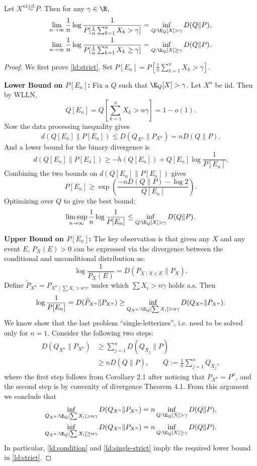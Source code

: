 \begin{theorem}
Let $X^n\stackrel{\mathrm{i.i.d.}}{\sim}P$. Then for any $\gamma\in\R$,
\begin{align}
\lim_{n\to\infty}\frac1n\log\frac1{P[\frac1n\sum_{k=1}^n X_k>\gamma]}
&=\inf_{Q:\E_Q[X]>\gamma}D(Q\|P),\label{ld:strict}\\
\lim_{n\to\infty}\frac1n\log\frac1{P[\frac1n\sum_{k=1}^n X_k\ge\gamma]}
&=\inf_{Q:\E_Q[X]\ge\gamma}D(Q\|P).\label{ld:closed}
\end{align}
\end{theorem}
\begin{proof}
We first prove \eqref{ld:strict}. Set $P[E_n]=P[\frac1n\sum_{k=1}^nX_k>\gamma]$.

\textbf{Lower Bound on $P[E_n]$:} Fix a $Q$ such that $\E_Q[X]>\gamma$. Let $X^n$ be iid. Then by WLLN,
\[
Q[E_n]=Q\left[\sum_{k=1}^nX_k>n\gamma\right]=1-o(1).
\]
Now the data processing inequality gives
\[
d(Q[E_n]\|P[E_n])\le D(Q_{X^n}\|P_{X^n})=nD(Q\|P).
\]
And a lower bound for the binary divergence is
\[
d(Q[E_n]\|P[E_n])\ge-h(Q[E_n])+Q[E_n]\log\frac1{P[E_n]}.
\]
Combining the two bounds on $d(Q[E_n]\|P[E_n])$ gives
\begin{equation}\label{ld:change}
P[E_n]\ge\exp\left(\frac{-nD(Q\|P)-\log2}{Q[E_n]}\right).
\end{equation}
Optimizing over $Q$ to give the best bound:
\[
\limsup_{n\to\infty}\frac1n\log\frac1{P[E_n]}
\le\inf_{Q:\E_Q[X]>\gamma}D(Q\|P).
\]

\textbf{Upper Bound on $P[E_n]$:} The key observation is that given any $X$ and any event $E$, $P_X(E)>0$ can be expressed via the divergence between the conditional and unconditional distribution as:
\[
\log\frac1{P_X(E)}=D(P_{X\mid X\in E}\|P_X).
\]
Define $\widetilde P_{X^n}=P_{X^n\mid\sum X_i>n\gamma}$, under which $\sum X_i>n\gamma$ holds a.s. Then
\begin{equation}\label{ld:condition}
\log\frac1{P[E_n]}=D(\widetilde P_{X^n}\|P_{X^n})
\ge\inf_{Q_{X^n}:\E_Q[\sum X_i]>n\gamma}D(Q_{X^n}\|P_{X^n}).
\end{equation}
We know show that the last problem ``single-letterizes'', i.e. need to be solved only for $n=1$. Consider the following two steps:
\begin{align}
D(Q_{X^n}\|P_{X^n})&\ge\sum_{j=1}^nD(Q_{X_j}\|P)\label{ld:product}\\
&\ge nD(\overline Q\|P),\qquad
\overline Q\mathrel{:=}\frac1n\sum_{j=1}^nQ_{X_j},\label{ld:convex}
\end{align}
where the first step follows from Corollary 2.1 after noticing that $P_{X^n}=P^n$, and the second step is by convexity of divergence Theorem 4.1. From this argument we conclude that
\begin{align}
\inf_{Q_{X^n}:\E_Q[\sum X_i]>n\gamma}D(Q_{X^n}\|P_{X^n})
&=n\inf_{Q:\E_Q[X]>\gamma}D(Q\|P),\label{ld:single-strict}\\
\inf_{Q_{X^n}:\E_Q[\sum X_i]\ge n\gamma}D(Q_{X^n}\|P_{X^n})
&=n\inf_{Q:\E_Q[X]\ge\gamma}D(Q\|P).\label{ld:single-closed}
\end{align}
In particular, \eqref{ld:condition} and \eqref{ld:single-strict} imply the required lower bound in \eqref{ld:strict}.


\end{proof}

